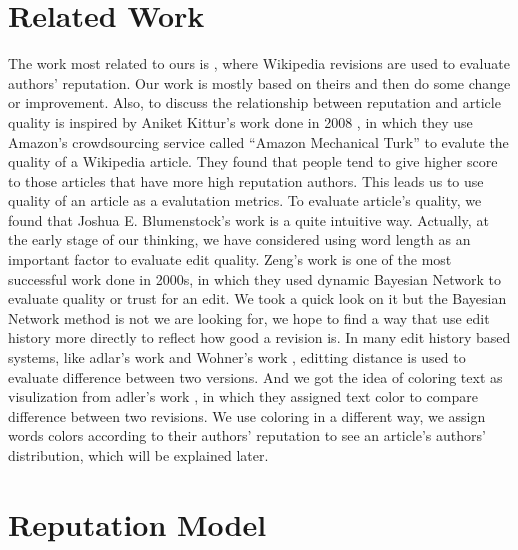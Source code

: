 \documentclass[preprint,review,12pt]{elsarticle}
\begin{document}
\section{Related Work}
The work most related to ours is \cite{adler2007content}, where Wikipedia
revisions are used to evaluate authors' reputation. Our work is mostly based on
theirs and then do some change or improvement. Also, to discuss the relationship
between reputation and article quality is inspired by Aniket Kittur's work done
in 2008 \cite{kittur2008can}, in which they use Amazon's crowdsourcing service
called ``Amazon Mechanical Turk'' to evalute the quality of a Wikipedia article.
They found that people tend to give higher score to those articles that have
more high reputation authors. This leads us to use quality of an article as a
evalutation metrics. To evaluate article's quality, we found that Joshua E.
Blumenstock's work \cite{blumenstock2008size} is a quite intuitive way.
Actually, at the early stage of our thinking, we have considered using word
length as an important factor to evaluate edit quality. Zeng's work
\cite{zeng2006computing} is one of the most successful work done in 2000s, in
which they used dynamic Bayesian Network to evaluate quality or trust for an edit. We
took a quick look on it but the Bayesian Network method is not we are looking
for, we hope to find a way that use edit history more directly to reflect how
good a revision is. In many edit history based systems, like adlar's work
\cite{adler2007content} and Wohner's work \cite{wohner2009assessing}, editting
distance is used to evaluate difference between two versions. And we got the
idea of coloring text as visulization from adler's work
\cite{adler2008assigning}, in which they assigned text color to compare
difference between two revisions. We use coloring in a different way, we assign
words colors according to their authors' reputation to see an article's authors'
distribution, which will be explained later.

\section{Reputation Model}
\end{document}
